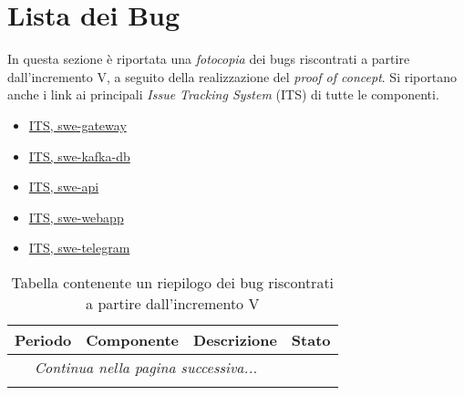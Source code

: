 

\newpage

\appendix
{}

\section{Lista dei Bug}

In questa sezione è riportata una \textit{fotocopia} dei bugs riscontrati a partire dall'incremento V, a seguito della realizzazione del \textit{proof of concept}. Si riportano anche i link ai principali \textit{Issue Tracking System} (ITS) di tutte le componenti.

	\begin{itemize}
		\item \href{https://github.com/RedRoundRobin/swe-gateway/issues}{ITS, swe-gateway}
		\item \href{https://github.com/RedRoundRobin/swe-kafka-db/issues}{ITS, swe-kafka-db}
		\item \href{https://github.com/RedRoundRobin/swe-api/issues}{ITS, swe-api}
		\item \href{https://github.com/RedRoundRobin/swe-webapp/issues}{ITS, swe-webapp}
		\item \href{https://github.com/RedRoundRobin/swe-telegram/issues}{ITS, swe-telegram}
	\end{itemize}

	\begin{center}
		\begin{longtable}{|c|c|p{9.5cm}|c|}
		\hline
		\rowcolor{lighter-grayer}
		\textbf{Periodo} & \textbf{Componente} & \textbf{Descrizione} & \textbf{Stato} \\
		\hline
		\endhead
		\hline
        \multicolumn{3}{|c|}{\textit{Continua nella pagina successiva...}}\\
        \hline
        \endfoot
        \endlastfoot

		\hline






		 \caption{Tabella contenente un riepilogo dei bug riscontrati a partire dall'incremento V}
		\end{longtable}
	\end{center}
		